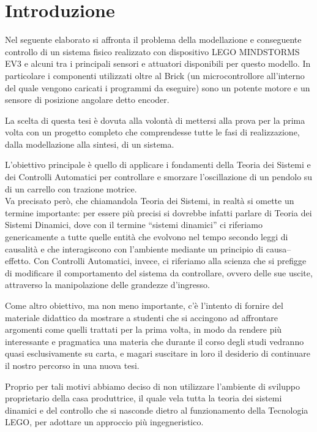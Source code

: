 \chapter{Introduzione}
Nel seguente elaborato si affronta il problema della modellazione e conseguente controllo di un sistema fisico realizzato con dispositivo LEGO MINDSTORMS EV3 e alcuni tra i principali sensori e attuatori disponibili per questo modello.
In particolare i componenti utilizzati oltre al Brick (un microcontrollore all'interno del quale vengono caricati i programmi da eseguire) sono un potente motore e un sensore di posizione angolare detto encoder.

La scelta di questa tesi è dovuta alla volontà di mettersi alla prova per la prima volta con un progetto completo che comprendesse tutte le fasi di realizzazione, dalla modellazione alla sintesi, di un sistema.

L'obiettivo principale è quello di applicare i fondamenti della Teoria dei Sistemi e dei Controlli Automatici per controllare e smorzare l'oscillazione di un pendolo su di un carrello con trazione motrice.\\
Va precisato però, che chiamandola Teoria dei Sistemi, in realtà si omette un termine importante: per essere più precisi si dovrebbe infatti parlare di Teoria dei Sistemi Dinamici, dove con il termine “sistemi dinamici” ci riferiamo genericamente a tutte quelle entità che evolvono nel tempo secondo leggi di causalità e che interagiscono con l’ambiente mediante un principio di causa–effetto. Con Controlli Automatici, invece, ci riferiamo alla scienza che si prefigge di modificare il comportamento del sistema da controllare, ovvero delle sue uscite, attraverso la manipolazione delle grandezze d'ingresso.

Come altro obiettivo, ma non meno importante, c'è l'intento di fornire del materiale didattico da mostrare a studenti che si accingono ad affrontare argomenti come quelli trattati per la prima volta, in modo da rendere più interessante e pragmatica una materia che durante il corso degli studi vedranno quasi esclusivamente su carta, e magari suscitare in loro il desiderio di continuare il nostro percorso in una nuova tesi. 

Proprio per tali motivi abbiamo deciso di non utilizzare l'ambiente di sviluppo proprietario della casa produttrice, il quale vela tutta la teoria dei sistemi dinamici e del controllo che si nasconde dietro al funzionamento della Tecnologia LEGO, per adottare un approccio più ingegneristico.

